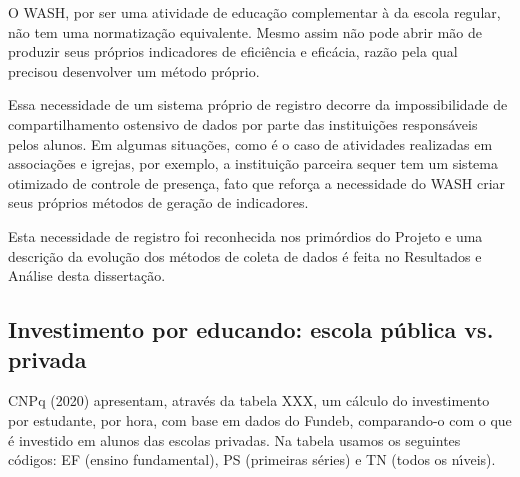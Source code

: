 \documentclass[
12pt,		%
openright,	%
twoside,  %
a4paper,			%
chapter=TITLE,		%
english,			%
french,				%
spanish,			%
brazil				%
]{USPSC-classe/USPSC}
\begin{document}
O WASH, por ser uma atividade de educa\c{c}\~ao complementar \`a da escola regular, n\~ao tem uma normatiza\c{c}\~ao equivalente. Mesmo assim n\~ao pode abrir m\~ao de produzir seus pr\'oprios indicadores de efici\^encia e efic\'acia, raz\~ao pela qual  precisou desenvolver um m\'etodo pr\'oprio.










Essa necessidade de um sistema pr\'oprio de registro decorre da impossibilidade de compartilhamento ostensivo de dados por parte das institui\c{c}\~oes respons\'aveis pelos alunos. Em algumas situa\c{c}\~oes, como \'e o caso de atividades realizadas em associa\c{c}\~oes e igrejas, por exemplo, a institui\c{c}\~ao parceira sequer tem um sistema otimizado de controle de presen\c{c}a, fato que refor\c{c}a a necessidade do WASH criar seus pr\'oprios m\'etodos de gera\c{c}\~ao de indicadores.










Esta necessidade de registro foi reconhecida nos prim\'ordios do Projeto e uma descri\c{c}\~ao da evolu\c{c}\~ao dos m\'etodos de coleta de dados \'e feita no Resultados e An\'alise desta disserta\c{c}\~ao.










\subsection[Investimento por educando: escola p\'ublica vs. privada]{Investimento por educando: escola p\'ublica vs. privada}\label{Investimento por educando: escola p\'ublica vs. privada}
CNPq (2020)  apresentam, atrav\'es da tabela XXX, um c\'alculo do investimento por estudante, por hora, com base em dados do Fundeb, comparando-o com o que \'e investido em alunos das escolas privadas. Na tabela usamos os seguintes c\'odigos: EF (ensino fundamental), PS (primeiras s\'eries) e TN (todos os n\'{\i}veis).
\end{document}
